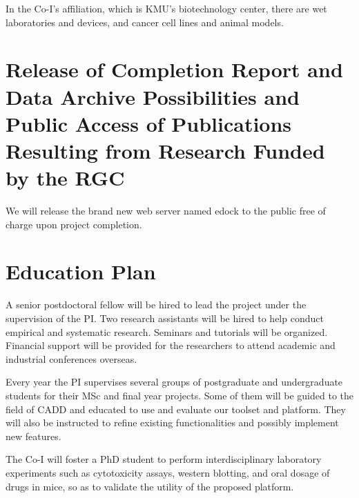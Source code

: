 \documentclass[a4paper,12pt]{article}
\begin{document}
In the Co-I's affiliation, which is KMU's biotechnology center, there are wet laboratories and devices, and cancer cell lines and animal models.

\section*{Release of Completion Report and Data Archive Possibilities and Public Access of Publications Resulting from Research Funded by the RGC}

We will release the brand new web server named edock to the public free of charge upon project completion.


\section*{Education Plan}

A senior postdoctoral fellow will be hired to lead the project under the supervision of the PI. Two research assistants will be hired to help conduct empirical and systematic research. Seminars and tutorials will be organized. Financial support will be provided for the researchers to attend academic and industrial conferences overseas.

Every year the PI supervises several groups of postgraduate and undergraduate students for their MSc and final year projects. Some of them will be guided to the field of CADD and educated to use and evaluate our toolset and platform. They will also be instructed to refine existing functionalities and possibly implement new features.

The Co-I will foster a PhD student to perform interdisciplinary laboratory experiments such as cytotoxicity assays, western blotting, and oral dosage of drugs in mice, so as to validate the utility of the proposed platform.

\newpage
\linespread{0.5}
\scriptsize



\newpage %
\end{document}
